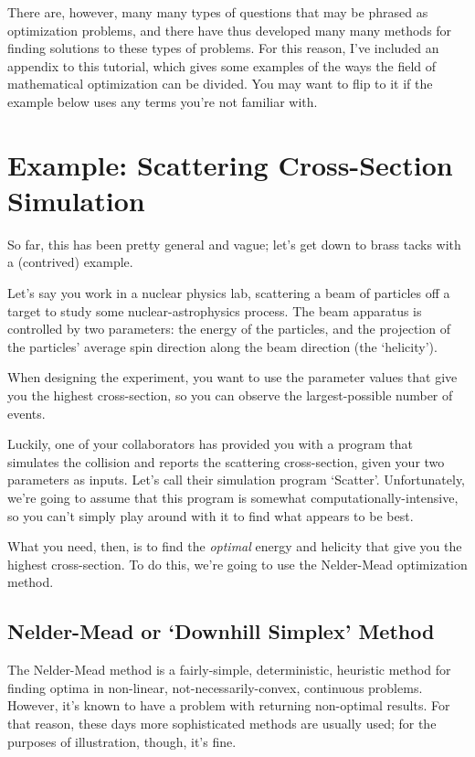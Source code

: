 \documentclass{article}
\begin{document}
	There are, however, many many types of questions that may be phrased as
	optimization problems, and there have thus developed many many methods
	for finding solutions to these types of problems. For this reason,
	I've included an appendix to this tutorial, which gives
	some examples of the ways the field of mathematical optimization can
	be divided. You may want to flip to it if the example below uses any terms 
	you're not familiar with.
	
\section*{Example: Scattering Cross-Section Simulation}
	So far, this has been pretty general and vague; let's get down
	to brass tacks with a (contrived) example. 

	Let's say you work in a nuclear physics lab, scattering a beam
	of particles off a target to study some nuclear-astrophysics process.
	The beam apparatus is controlled by two parameters: the energy of
	the particles, and the projection of the particles' average spin direction along
	the beam direction (the `helicity'). 

	When designing the experiment, you want to use the parameter values
  that give you the highest cross-section, so you can observe the largest-possible
	number of events.

	Luckily, one of your collaborators has provided you with
	a program that simulates
	the collision and reports the scattering cross-section, given your two
	parameters as inputs. Let's call their simulation program `Scatter'.
	Unfortunately, we're going to assume 
	that this program is somewhat computationally-intensive,
	so you can't simply play around with it to find what appears
	to be best.

	What you need, then, is to find the \emph{optimal} energy and helicity
	that give you the highest cross-section. To do this, we're going to use
	the Nelder-Mead optimization method.

	\subsection*{Nelder-Mead or `Downhill Simplex' Method}
		The Nelder-Mead method is a fairly-simple, deterministic, heuristic method
		for finding optima in non-linear, not-necessarily-convex, continuous problems.
		However, it's known to have
		a problem with returning non-optimal results. For that reason,
		these days more sophisticated methods are usually used; for
		the purposes of illustration, though, it's fine.
\end{document}
